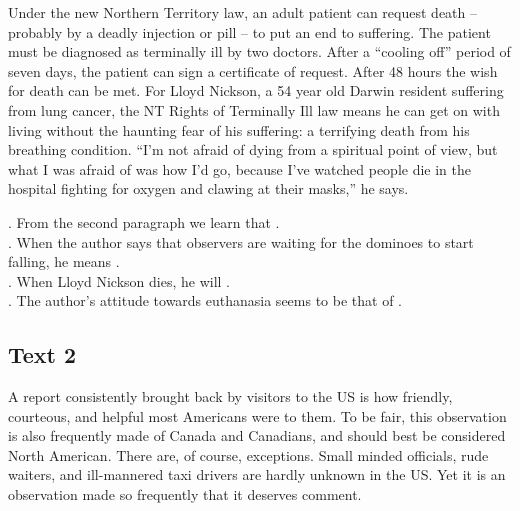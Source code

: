 Under the new Northern Territory law, an adult patient can request death -- probably by a deadly injection or pill -- to put an end to suffering. The patient must be diagnosed as terminally ill by two doctors. After a “cooling off” period of seven days, the patient can sign a certificate of request. After 48 hours the wish for death can be met. For Lloyd Nickson, a 54 year old Darwin resident suffering from lung cancer, the NT Rights of Terminally Ill law means he can get on with living without the haunting fear of his suffering: a terrifying death from his breathing condition. “I’m not afraid of dying from a spiritual point of view, but what I was afraid of was how I’d go, because I’ve watched people die in the hospital fighting for oxygen and clawing at their masks,” he says.
\begin{questions}  
.	From the second paragraph we learn that \ltk{}.\\
.	When the author says that observers are waiting for the dominoes to start falling, he means \ltk{}.\\
.	When Lloyd Nickson dies, he will \ltk{}.\\
.	The author’s attitude towards euthanasia seems to be that of \ltk{}.\\
\end{questions}

  \subsection{Text 2}
A report consistently brought back by visitors to the US is how friendly, courteous, and helpful most Americans were to them. To be fair, this observation is also frequently made of Canada and Canadians, and should best be considered North American. There are, of course, exceptions. Small minded officials, rude waiters, and ill-mannered taxi drivers are hardly unknown in the US. Yet it is an observation made so frequently that it deserves comment.

